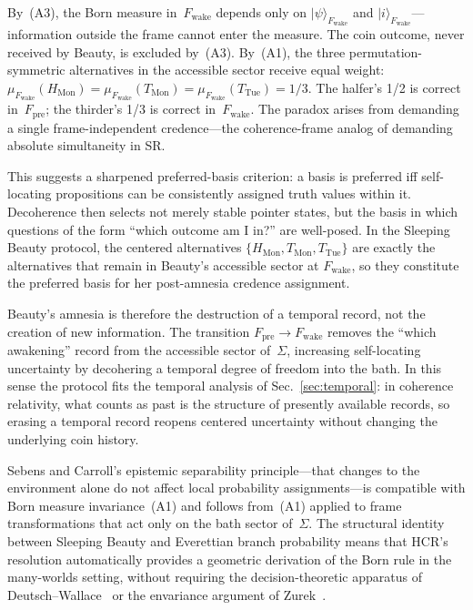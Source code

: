 \documentclass[aps,prd,twocolumn,superscriptaddress,nofootinbib,floatfix]{revtex4-2}
\newcommand{\Sig}{\Sigma}
\newcommand{\HCR}{HCR}
\newcommand{\CR}{\HCR}  %
\begin{document}
By~(A3), the Born measure in~$F_{\mathrm{wake}}$ depends only on $|\psi\rangle_{F_{\mathrm{wake}}}$ and $|i\rangle_{F_{\mathrm{wake}}}$---information outside the frame cannot enter the measure. The coin outcome, never received by Beauty, is excluded by~(A3). By~(A1), the three permutation-symmetric alternatives in the accessible sector receive equal weight: $\mu_{F_{\mathrm{wake}}}(H_{\mathrm{Mon}}) = \mu_{F_{\mathrm{wake}}}(T_{\mathrm{Mon}}) = \mu_{F_{\mathrm{wake}}}(T_{\mathrm{Tue}}) = 1/3$. The halfer's 1/2 is correct in~$F_{\mathrm{pre}}$; the thirder's 1/3 is correct in~$F_{\mathrm{wake}}$. The paradox arises from demanding a single frame-independent credence---the coherence-frame analog of demanding absolute simultaneity in SR.

This suggests a sharpened preferred-basis criterion: a basis is preferred iff self-locating propositions can be consistently assigned truth values within it. Decoherence then selects not merely stable pointer states, but the basis in which questions of the form ``which outcome am I in?'' are well-posed. In the Sleeping Beauty protocol, the centered alternatives $\{H_{\mathrm{Mon}},T_{\mathrm{Mon}},T_{\mathrm{Tue}}\}$ are exactly the alternatives that remain in Beauty's accessible sector at $F_{\mathrm{wake}}$, so they constitute the preferred basis for her post-amnesia credence assignment.

Beauty's amnesia is therefore the destruction of a temporal record, not the creation of new information. The transition $F_{\mathrm{pre}} \to F_{\mathrm{wake}}$ removes the ``which awakening'' record from the accessible sector of~$\Sig$, increasing self-locating uncertainty by decohering a temporal degree of freedom into the bath. In this sense the protocol fits the temporal analysis of Sec.~\ref{sec:temporal}: in coherence relativity, what counts as past is the structure of presently available records, so erasing a temporal record reopens centered uncertainty without changing the underlying coin history.

Sebens and Carroll's epistemic separability principle---that changes to the environment alone do not affect local probability assignments---is compatible with Born measure invariance~(A1) and follows from~(A1) applied to frame transformations that act only on the bath sector of~$\Sig$. The structural identity between Sleeping Beauty and Everettian branch probability means that \CR{}'s resolution automatically provides a geometric derivation of the Born rule in the many-worlds setting, without requiring the decision-theoretic apparatus of Deutsch--Wallace~\cite{deutschQuantumTheoryProbability1999,wallaceEmergentMultiverseQuantum2012} or the envariance argument of Zurek~\cite{zurekProbabilitiesEntanglementBorns2005}.
\end{document}
